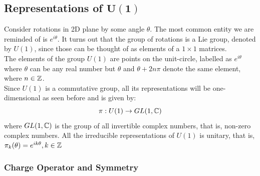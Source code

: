 \subsection{Representations of $\boldsymbol{U(1)}$}
Consider rotations in 2D plane by some angle $\theta$. The most common entity we are reminded of is $e^{i\theta}$. It turns out that the group of rotations is a Lie group, denoted by $U(1)$, since those can be thought of as elements of a $1\times 1$ matrices.\\[0.2cm]
The elements of the group $U(1)$ are points on the unit-circle, labelled as $e^{i\theta}$ where $\theta$ can be any real number but $\theta$ and $\theta+2n\pi$ denote the same element, where $n\in \mathbb{Z}$. \\[0.2cm]
Since $U(1)$ is a commutative group, all its representations will be one-dimensional as seen before and is given by:
$$\pi: U(1)\rightarrow GL(1,\mathbb{C})$$
where $GL(1,\mathbb{C})$ is the group of all invertible complex numbers, that is, non-zero complex numbers. All the irreducible representations of $U(1)$ is unitary, that is, $\pi_k(\theta) = e^{ik\theta}, k\in \mathbb{Z}$
\subsubsection{Charge Operator and Symmetry}

